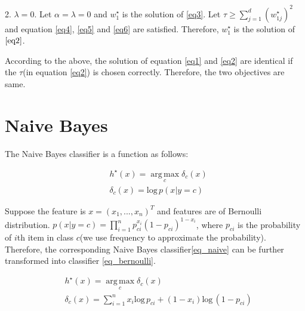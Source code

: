 \documentclass[10pt]{article}
\begin{document}
2. $\lambda=0$. Let $\alpha=\lambda = 0$ and $w^{\star}_{1}$ is the solution of \ref{eq3}. Let $\tau\geq\displaystyle\sum_{j=1}^{d}(w^{\star}_{1j})^{2}$ and equation \ref{eq4}, \ref{eq5} and \ref{eq6} are satisfied. Therefore, $w^{\star}_{1}$ is the solution of $\ref{eq2}$.

According to the above, the solution of equation \ref{eq1} and \ref{eq2} are identical if the $\tau$(in equation \ref{eq2}) is chosen correctly. Therefore, the two objectives are same.

\section{Naive Bayes}
The Naive Bayes classifier is a function as follows:

\begin{equation}\label{eq_naive}
\begin{aligned}
& h^{\star}(x)=\operatorname*{arg\,max}_c \delta_{c}(x) \\
& \delta_{c}(x) = \text{log}\,p(x|y=c)
\end{aligned}
\end{equation}

Suppose the feature is $x=(x_{1},...,x_{n})^{T}$ and features are of Bernoulli distribution. $p(x|y=c)=\displaystyle\prod_{i=1}^{n}p_{ci}^{x_{i}}(1-p_{ci})^{1-x_{i}}$, where $p_{ci}$ is the probability of $i$th item in class $c$(we use frequency to approximate the probability). Therefore, the corresponding Naive Bayes classifier\ref{eq_naive} can be further transformed into classifier \ref{eq_bernoulli}.

\begin{equation}\label{eq_bernoulli}
\begin{aligned}
& h^{\star}(x)=\operatorname*{arg\,max}_c \delta_{c}(x) \\
& \delta_{c}(x) = \displaystyle\sum_{i=1}^{n}x_{i}\text{log}\,p_{ci}+(1-x_{i})\text{log}\,(1-p_{ci})
\end{aligned}
\end{equation}



\end{document}

